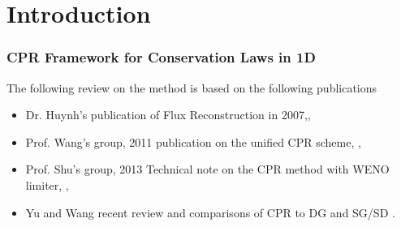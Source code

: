 \section{Introduction}

\begin{frame} \frametitle{CPR Framework for Conservation Laws in 1D}
 The following review on the method is based on the following publications
 \begin{itemize}
  \item Dr. Huynh's publication of Flux Reconstruction in 2007,\cite{Huynh2007},
  \item Prof. Wang's group, 2011 publication on the unified CPR scheme, \cite{Wang_etal2011},
  \item Prof. Shu's group, 2013 Technical note on the CPR method with WENO limiter, \cite{DuShu&Zhang2013},
  \item Yu and Wang recent review and comparisons of CPR to DG and SG/SD \cite{Yu&Wang2013}.
 \end{itemize}
\end{frame}